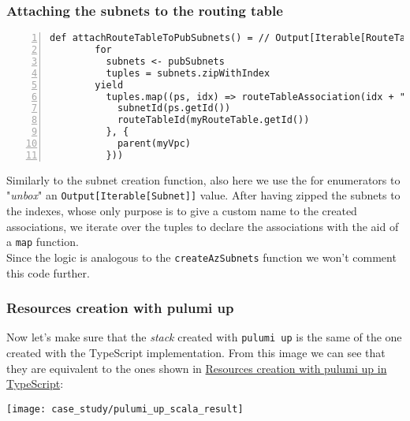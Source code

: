 \subsubsection{Attaching the subnets to the routing table}
\begin{minipage}{\linewidth}
\begin{lstlisting}[numbers=left, numberstyle=\tiny, numbersep=-5pt, stepnumber=1]
  def attachRouteTableToPubSubnets() = // Output[Iterable[RouteTableAssociation]] 
        for
          subnets <- pubSubnets
          tuples = subnets.zipWithIndex
        yield
          tuples.map((ps, idx) => routeTableAssociation(idx + "-assoc-scala") ({
            subnetId(ps.getId())
            routeTableId(myRouteTable.getId())
          }, {
            parent(myVpc)
          }))
\end{lstlisting}
\end{minipage}
Similarly to the subnet creation function, also here we use the for enumerators to "\textit{unbox}" an \texttt{Output[Iterable[Subnet]]} value.
After having zipped the subnets to the indexes, whose only purpose is to give a custom name to the created associations, we iterate over the tuples to declare the associations with the aid of a \texttt{map} function.\\
Since the logic is analogous to the \texttt{createAzSubnets} function we won't comment this code further.

\subsubsection{Resources creation with pulumi up}
\label{sssec:res-cre-ts}
Now let's make sure that the \textit{stack} created with \texttt{pulumi up} is the same of the one created with the TypeScript implementation.
From this image we can see that they are equivalent to the ones shown in \hyperref[sssec:res-cre-ts]{Resources creation with pulumi up in TypeScript}:
\begin{center}
  \texttt{[image: case\_study/pulumi\_up\_scala\_result]} 
\end{center}\mbox{}\\

